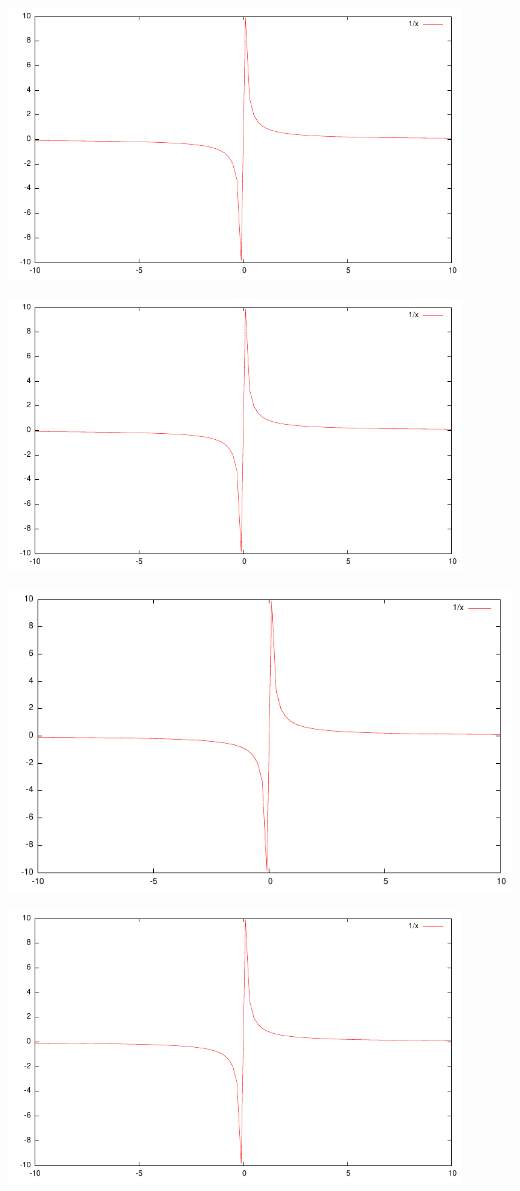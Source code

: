 \documentclass{article}
\begin{document}
\includegraphics[width=0.9\textwidth]{g1}

\includegraphics[width=0.9\textwidth]{g2}

\includegraphics[width=1.1\textwidth]{g3}

\includegraphics[width=0.9\textwidth]{g4}
\end{document}
